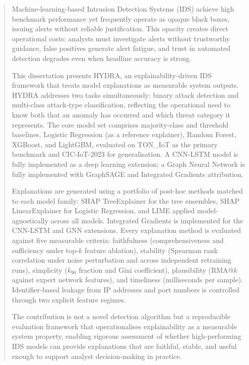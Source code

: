 \documentclass[12pt,a4paper]{report}
\begin{document}
\newpage
\begin{abstract}
Machine-learning-based Intrusion Detection Systems (IDS) achieve high benchmark performance yet frequently operate as opaque black boxes, issuing alerts without reliable justification. This opacity creates direct operational costs: analysts must investigate alerts without trustworthy guidance, false positives generate alert fatigue, and trust in automated detection degrades even when headline accuracy is strong.

This dissertation presents HYDRA, an explainability-driven IDS framework that treats model explanations as measurable system outputs. HYDRA addresses two tasks simultaneously: binary attack detection and multi-class attack-type classification, reflecting the operational need to know both that an anomaly has occurred and which threat category it represents. The core model set comprises majority-class and threshold baselines, Logistic Regression (as a reference explainer), Random Forest, XGBoost, and LightGBM, evaluated on TON\_IoT as the primary benchmark and CIC-IoT-2023 for generalisation. A CNN-LSTM model is fully implemented as a deep learning extension; a Graph Neural Network is fully implemented with GraphSAGE and Integrated Gradients attribution.

Explanations are generated using a portfolio of post-hoc methods matched to each model family: SHAP TreeExplainer for the tree ensembles, SHAP LinearExplainer for Logistic Regression, and LIME applied model-agnostically across all models. Integrated Gradients is implemented for the CNN-LSTM and GNN extensions. Every explanation method is evaluated against five measurable criteria: faithfulness (comprehensiveness and sufficiency under top-$k$ feature ablation), stability (Spearman rank correlation under noise perturbation and across independent retraining runs), simplicity ($k_{90}$ fraction and Gini coefficient), plausibility (RMA@$k$ against expert network features), and timeliness (milliseconds per sample). Identifier-based leakage from IP addresses and port numbers is controlled through two explicit feature regimes.

The contribution is not a novel detection algorithm but a reproducible evaluation framework that operationalises explainability as a measurable system property, enabling rigorous assessment of whether high-performing IDS models can provide explanations that are faithful, stable, and useful enough to support analyst decision-making in practice.


\end{abstract}
\end{document}
